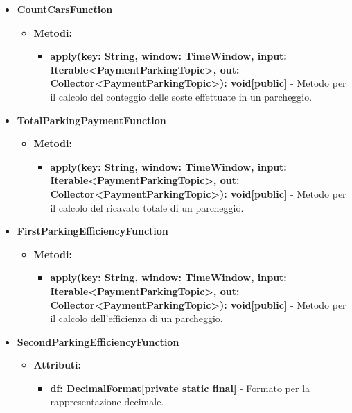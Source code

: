 \documentclass[8pt]{article}
\begin{document}
\begin{itemize}
\begin{itemize}
\begin{itemize}
        \end{itemize}
    \end{itemize}
    \item \textbf{CountCarsFunction}
    \begin{itemize}
        \item \textbf{Metodi:}
        \begin{itemize}
            \item \textbf{apply(key: String, window: TimeWindow, input: Iterable<PaymentParkingTopic>, out: Collector<PaymentParkingTopic>): void[public]} - Metodo per il calcolo del conteggio delle soste effettuate in un parcheggio.
        \end{itemize}
    \end{itemize}
    \item \textbf{TotalParkingPaymentFunction}
    \begin{itemize}
        \item \textbf{Metodi:}
        \begin{itemize}
            \item \textbf{apply(key: String, window: TimeWindow, input: Iterable<PaymentParkingTopic>, out: Collector<PaymentParkingTopic>): void[public]} - Metodo per il calcolo del ricavato totale di un parcheggio.
        \end{itemize}
    \end{itemize}
    \item \textbf{FirstParkingEfficiencyFunction}
    \begin{itemize}
        \item \textbf{Metodi:}
        \begin{itemize}
            \item \textbf{apply(key: String, window: TimeWindow, input: Iterable<PaymentParkingTopic>, out: Collector<PaymentParkingTopic>): void[public]} - Metodo per il calcolo dell'efficienza di un parcheggio.
        \end{itemize}
    \end{itemize}
    \item \textbf{SecondParkingEfficiencyFunction}
    \begin{itemize}
        \item \textbf{Attributi:}
        \begin{itemize}
            \item \textbf{df: DecimalFormat[private static final]} - Formato per la rappresentazione decimale.
        \end{itemize}

\end{itemize}
\end{itemize}
\end{document}
